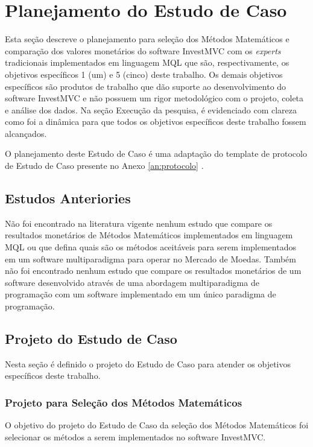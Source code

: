 \section{Planejamento do Estudo de Caso}

Esta seção descreve o planejamento para seleção dos Métodos Matemáticos e comparação dos valores monetários do software InvestMVC com os \textit{experts} tradicionais implementados em linguagem MQL que são, respectivamente, os objetivos específicos 1 (um) e 5 (cinco) deste trabalho. Os demais objetivos específicos são produtos de trabalho que dão suporte ao desenvolvimento do software InvestMVC e não possuem um rigor metodológico com o projeto, coleta e análise dos dados. Na seção Execução da pesquisa, é evidenciado com clareza como foi a dinâmica para que todos os objetivos específicos deste trabalho fossem alcançados.

 O planejamento deste Estudo de Caso é uma adaptação do template de protocolo de Estudo de Caso presente no Anexo \ref{an:protocolo} \cite{brereton}.

\subsection{Estudos Anteriories}
Não foi encontrado na literatura vigente nenhum estudo que compare os resultados monetários de Métodos Matemáticos implementados em linguagem MQL ou que defina quais são os métodos aceitáveis para serem implementados em um software multiparadigma para operar no Mercado de Moedas. Também não foi encontrado nenhum estudo que compare os resultados monetários de um software desenvolvido através de uma abordagem multiparadigma de programação com um software implementado em um único paradigma de programação.

\subsection{Projeto do Estudo de Caso}
\label{sec:projetoEstudo}
Nesta seção é definido o projeto do Estudo de Caso para atender os objetivos específicos deste trabalho.

\subsubsection{Projeto para Seleção dos Métodos Matemáticos}
O objetivo do projeto do Estudo de Caso da seleção dos Métodos Matemáticos foi selecionar os métodos a serem implementados no software InvestMVC.

